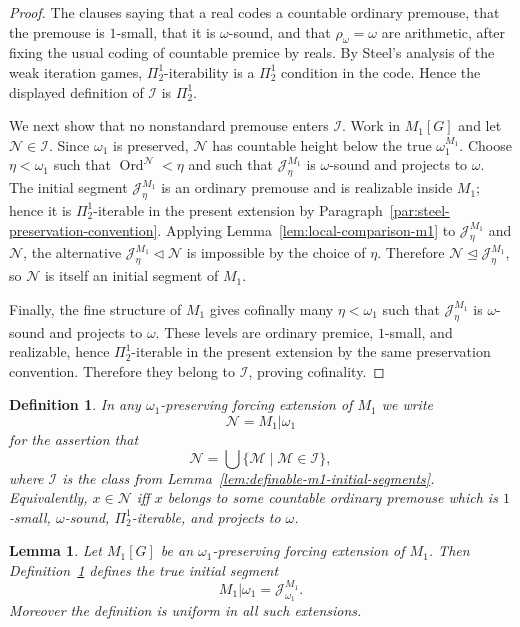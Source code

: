 \documentclass[a4paper,11pt]{article}
\newtheorem{lemma}[theorem]{Lemma}
\newtheorem{definition}[theorem]{Definition}
\begin{document}
\begin{proof}
The clauses saying that a real codes a countable ordinary premouse, that the premouse is $1$-small, that it is $\omega$-sound, and that $\rho_\omega=\omega$ are arithmetic, after fixing the usual coding of countable premice by reals.  By Steel's analysis of the weak iteration games, $\Pi^1_2$-iterability is a $\Pi^1_2$ condition in the code.  Hence the displayed definition of $\mathcal I$ is $\Pi^1_2$.

We next show that no nonstandard premouse enters $\mathcal I$.  Work in $M_1[G]$ and let $\mathcal N\in\mathcal I$.  Since $\omega_1$ is preserved, $\mathcal N$ has countable height below the true $\omega_1^{M_1}$.  Choose $\eta<\omega_1$ such that $\operatorname{Ord}^{\mathcal N}<\eta$ and such that $\mathcal J_\eta^{M_1}$ is $\omega$-sound and projects to $\omega$.  The initial segment $\mathcal J_\eta^{M_1}$ is an ordinary premouse and is realizable inside $M_1$; hence it is $\Pi^1_2$-iterable in the present extension by Paragraph~\ref{par:steel-preservation-convention}.  Applying Lemma~\ref{lem:local-comparison-m1} to $\mathcal J_\eta^{M_1}$ and $\mathcal N$, the alternative $\mathcal J_\eta^{M_1}\triangleleft\mathcal N$ is impossible by the choice of $\eta$.  Therefore $\mathcal N\trianglelefteq\mathcal J_\eta^{M_1}$, so $\mathcal N$ is itself an initial segment of $M_1$.

Finally, the fine structure of $M_1$ gives cofinally many $\eta<\omega_1$ such that $\mathcal J_\eta^{M_1}$ is $\omega$-sound and projects to $\omega$.  These levels are ordinary premice, $1$-small, and realizable, hence $\Pi^1_2$-iterable in the present extension by the same preservation convention.  Therefore they belong to $\mathcal I$, proving cofinality.
\end{proof}

\begin{definition}\label{def:recover-m1-omega1}
In any $\omega_1$-preserving forcing extension of $M_1$ we write
\[
   \mathcal N=M_1|\omega_1
\]
for the assertion that
\[
   \mathcal N=\bigcup\{\mathcal M\mid \mathcal M\in\mathcal I\},
\]
where $\mathcal I$ is the class from Lemma~\ref{lem:definable-m1-initial-segments}.
Equivalently, $x\in\mathcal N$ iff $x$ belongs to some countable ordinary premouse which is $1$-small, $\omega$-sound, $\Pi^1_2$-iterable, and projects to $\omega$.
\end{definition}

\begin{lemma}\label{lem:recover-m1-omega1}
Let $M_1[G]$ be an $\omega_1$-preserving forcing extension of $M_1$.  Then Definition~\ref{def:recover-m1-omega1} defines the true initial segment
\[
   M_1|\omega_1=\mathcal J^{M_1}_{\omega_1}.
\]
Moreover the definition is uniform in all such extensions.
\end{lemma}
\end{document}
